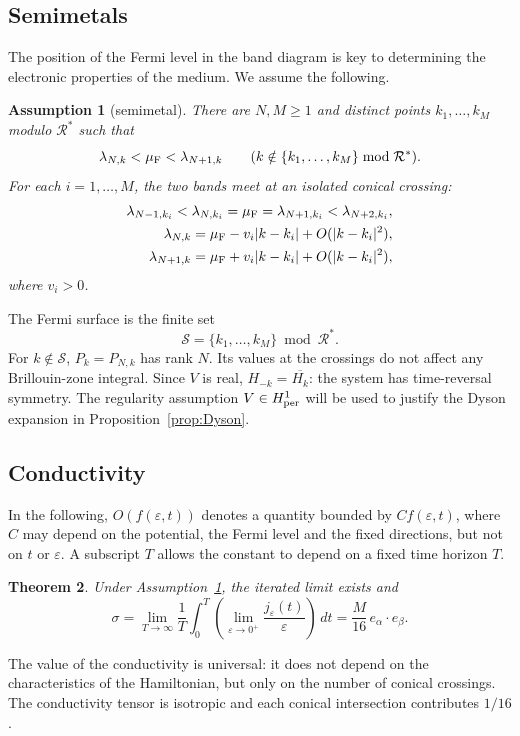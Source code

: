 \documentclass[a4paper,11pt]{article}
\theoremstyle{plain}
\newtheorem{theorem}{Theorem}[section]
\newtheorem{assumption}[theorem]{Assumption}
\theoremstyle{remark}
\def\eps{{\varepsilon}}
\def\cR{{\mathcal R}}
\begin{document}
\subsection{Semimetals}\label{sec:semimetal-assumptions}
The position of the Fermi level in the band diagram is key to determining
the electronic properties of the medium. We assume the following.
\begin{assumption}[semimetal]\label{ass:semimetal}
There are $N,M\ge1$ and distinct points $k_1,\ldots,k_M$ modulo $\cR^*$ such that
\[
\lambda_{N,k}<\mu_{\rm F}<\lambda_{N+1,k}\qquad
(k\notin\{k_1,\ldots,k_M\}\bmod\cR^*).
\]
For each $i=1,\ldots,M$, the two bands meet at an isolated conical crossing:
\begin{align}
\lambda_{N-1,k_i}<\lambda_{N,k_i}=\mu_{\rm F}
=\lambda_{N+1,k_i}<\lambda_{N+2,k_i},\label{hyp:semimetals_1}\\
\lambda_{N,k}=\mu_{\rm F}-v_i|k-k_i|+O(|k-k_i|^2),\label{hyp:semimetals_2}\\
\lambda_{N+1,k}=\mu_{\rm F}+v_i|k-k_i|+O(|k-k_i|^2),\label{hyp:semimetals_3}
\end{align}
where $v_i>0$.
\end{assumption}
The Fermi surface is the finite set
\begin{equation}\label{eq:Fermi_surface}
\mathcal S=\{k_1,\ldots,k_M\}\bmod\cR^*.
\end{equation}
For $k\notin\mathcal S$, $P_k=P_{N,k}$ has rank $N$. Its values at the
crossings do not affect any Brillouin-zone integral. Since $V$ is real,
$H_{-k}=\overline{H_k}$: the system has time-reversal symmetry.
The regularity assumption $V\in H^1_{\rm per}$ will be used to justify the
Dyson expansion in Proposition~\ref{prop:Dyson}.


\subsection{Conductivity}
In the following, $O(f(\eps,t))$ denotes a quantity bounded by $Cf(\eps,t)$,
where $C$ may depend on the potential, the Fermi level and the fixed
directions, but not on $t$ or $\eps$. A subscript $T$ allows the constant
to depend on a fixed time horizon $T$.
\begin{theorem}\label{theo:semi-metal}
Under Assumption~\ref{ass:semimetal}, the iterated limit exists and
\[
\sigma=\lim_{T\to\infty}\frac1T\int_0^T
\left(\lim_{\eps\to0^+}\frac{j_\eps(t)}{\eps}\right)\,dt
=\frac{M}{16}\,e_\alpha\cdot e_\beta.
\]
\end{theorem}
The value of the conductivity is universal: it does not depend on the
characteristics of the Hamiltonian, but only on the number of conical
crossings. The conductivity tensor is isotropic and each conical
intersection contributes $1/16$.
\end{document}
